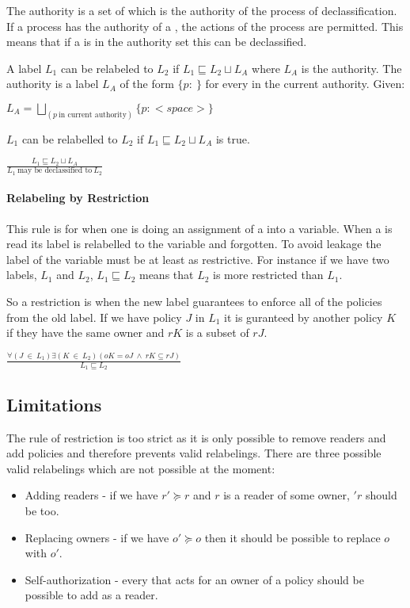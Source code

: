 The authority is a set of \principals{} which is the authority of the process of declassification.
If a process has the authority of a \principal{}, the actions of the process are permitted.
This means that if a \principal{} is in the authority set this can be declassified.

A label $L_1$ can be relabeled to $L_2$ if $L_1 \sqsubseteq L_2 \sqcup L_A$ where $L_A$ is the authority.
The authority is a label $L_A$ of the form $\{p: \ \}$ for every \principal{} in the current authority.
Given:
\begin{center}
  $L_A = \bigsqcup_{(p \  \mbox{in current authority})}\{p: <space> \}$
\end{center}
$L_1$ can be relabelled to $L_2$ if $L_1 \sqsubseteq L_2 \sqcup L_A$ is true.
\begin{definition}
    $\frac{L_1 \sqsubseteq L_2 \sqcup L_A}{L_1 \ \mbox{may be declassified to} \ L_2}$
\end{definition}

\paragraph{Relabeling by Restriction}
This rule is for when one is doing an assignment of a \xvalue{} into a variable.
When a \xvalue{} is read its label is relabelled to the variable and forgotten.
To avoid leakage the label of the variable must be at least as restrictive.
For instance if we have two labels, $L_1$ and $L_2$, $L_1 \sqsubseteq L_2$ means that $L_2$ is more restricted than $L_1$.

So a restriction is when the new label guarantees to enforce all of the policies from the old label.
If we have policy $J$ in $L_1$ it is guranteed by another policy $K$ if they have the same owner and $rK$ is a subset of $rJ$.
\begin{definition}
$\frac{\forall (J \ \in \ L_1) \exists (K \ \in \ L_2)(oK = oJ \ \wedge \ rK \subseteq rJ)}{L_1 \sqsubseteq L_2}$
\end{definition}

\subsection{Limitations}
The rule of restriction is too strict as it is only possible to remove readers and add policies  and therefore prevents valid relabelings.
There are three possible valid relabelings which are not possible at the moment:
\begin{itemize}
\item Adding readers - if we have $r' \succeq r$ and $r$ is a reader of some owner, $'r$ should be too.
\item Replacing owners - if we have $o' \succeq o$ then it should be possible to replace $o$ with $o'$.
\item Self-authorization - every \principal{} that acts for an owner of a policy should be possible to add as a reader.
\end{itemize}

